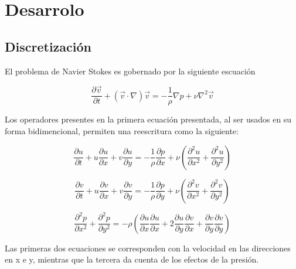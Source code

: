 \section{Desarrolo}

\subsection{Discretización}
El problema de Navier Stokes es gobernado por la siguiente escuación

$$\frac{\partial \vec{v}}{\partial t}+(\vec{v}\cdot\nabla)\vec{v}=-\frac{1}{\rho}\nabla p + \nu \nabla^2\vec{v}$$


Los operadores presentes en la primera ecuación presentada, al ser usados en su forma bidimencional, permiten una reescritura como la siguiente:

$$\frac{\partial u}{\partial t}+u\frac{\partial u}{\partial x}+v\frac{\partial u}{\partial y} = -\frac{1}{\rho}\frac{\partial p}{\partial x}+\nu \left(\frac{\partial^2 u}{\partial x^2}+\frac{\partial^2 u}{\partial y^2} \right)$$

$$\frac{\partial v}{\partial t}+u\frac{\partial v}{\partial x}+v\frac{\partial v}{\partial y} = -\frac{1}{\rho}\frac{\partial p}{\partial y}+\nu\left(\frac{\partial^2 v}{\partial x^2}+\frac{\partial^2 v}{\partial y^2}\right)$$

$$\frac{\partial^2 p}{\partial x^2}+\frac{\partial^2 p}{\partial y^2} = -\rho\left(\frac{\partial u}{\partial x}\frac{\partial u}{\partial x}+2\frac{\partial u}{\partial y}\frac{\partial v}{\partial x}+\frac{\partial v}{\partial y}\frac{\partial v}{\partial y} \right)$$

Las primeras dos ecuaciones se corresponden con la velocidad en las direcciones en x e y, mientras que la tercera da cuenta de los efectos de la presión.


